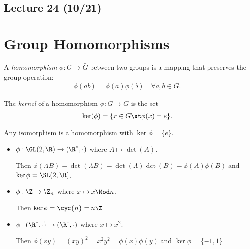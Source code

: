 
\subsection*{Lecture 24 (10/21)} %
\section{Group Homomorphisms} %

\begin{definition}[homomorphism]
  A \emph{homomorphism} \(\phi: G\to \bar G\) between two groups is a mapping that preserves the group operation:
  \begin{align*}
      \phi(ab) = \phi(a)\phi(b)\quad \forall a,b\in G.
  \end{align*}
  \end{definition}

  \begin{definition}[kernel]
  The \emph{kernel} of a homomorphism \(\phi: G\to \bar G\) is the set
      \begin{align*}
          \ker(\phi) = \{x\in G \st \phi(x)=\bar e\}.
      \end{align*}
  \end{definition}

  \begin{example}
      Any isomorphism is a homomorphism with \(\ker\phi=\{e\}\).
  \end{example}

  \begin{examples}
  \begin{itemize}
      \item \(\phi:\GL(2,\R)\to (\R^*, \cdot)\) where \(A\mapsto \det(A)\).

      Then \(\phi(AB) = \det(AB) = \det(A)\det(B) = \phi(A)\phi(B)\) and \(\ker\phi = \SL(2,\R)\).

      \item \(\phi: \Z \to \Z_n\) where \(x\mapsto x\Mod n\).

      Then \(\ker\phi = \cyc{n} = n\Z\)

      \item \(\phi: (\R^*, \cdot)\to (\R^*, \cdot)\) where \(x\mapsto x^2\).

      Then \(\phi(xy)=(xy)^2 = x^2y^2=\phi(x)\phi(y)\) and \(\ker\phi = \{-1, 1\}\)
  \end{itemize}
  \end{examples}

